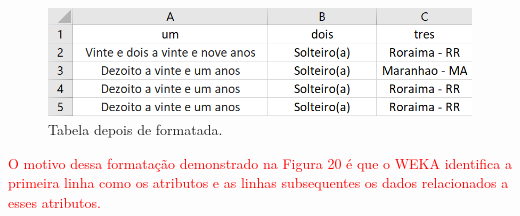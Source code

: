 \par
\begin{figure}[!htp]
	\begin{center}
    \caption{\label{fig:waveform_fig} Tabela depois de formatada.}
	\includegraphics[scale=0.65]{Figuras/Formato_certo.png}
	\end{center}
\end{figure}

\par
\textcolor{red}{O motivo dessa formatação demonstrado na Figura 20 é que o WEKA identifica a primeira linha como os atributos e as linhas subsequentes os dados relacionados a esses atributos.}

